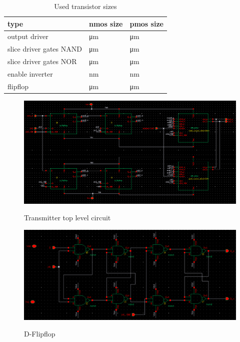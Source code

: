 \begin{table}[H]
  \centering
  \begin{tabular}{l|l|l}
    type & nmos size & pmos size\\
    \hline
    output driver & \unit[8]{\um} & \unit[24]{\um}\\
    slice driver gates NAND & \unit[3]{\um} & \unit[3]{\um}\\
    slice driver gates NOR & \unit[1]{\um} & \unit[4]{\um}\\
    enable inverter & \unit[200]{nm} & \unit[400]{nm}\\
    flipflop & \unit[6]{\um} & \unit[12]{\um}\\
  \end{tabular}
  \caption{Used transistor sizes}
  \label{tab:scaling}
\end{table}

\begin{figure}[H]
  \centering
  {\includegraphics[scale=0.55]{img/transmitter.png}}
  \caption{Transmitter top level circuit}
  \label{fig:top_level}
\end{figure}

\begin{figure}[H]
  \centering
  {\includegraphics[scale=0.47]{img/flipflop.png}}
  \caption{D-Flipflop}
  \label{fig:flipflop}
\end{figure}

